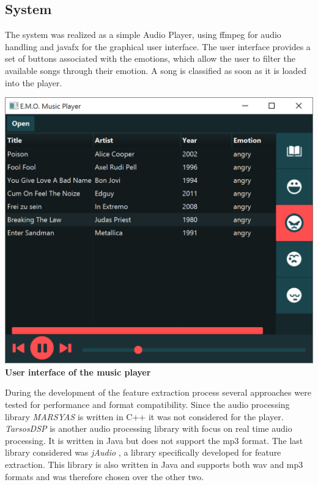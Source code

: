 \begin{multicols}{2}
\section{System}
The system was realized as a simple Audio Player, using ffmpeg for audio handling and javafx for the graphical user interface. The user interface provides a set of buttons associated with the emotions, which allow the user to filter the available songs through their emotion. A song is classified as soon as it is loaded into the player.

\begin{Figure}
	\label{screenshot}
	\includegraphics[width=\linewidth]{images/screenshot.png}
	\centering
	\textbf{User interface of the music player}
\end{Figure}
\vspace*{10pt}

During the development of the feature extraction process several approaches were tested for performance and format compatibility. Since the audio processing library \textit{MARSYAS} \citep{Tzanetakis1999} is written in C++ it was not considered for the player. \textit{TarsosDSP} \citep{Six2014} is another audio processing library with focus on real time audio processing. It is written in Java but does not support the mp3 format. The last library considered was \textit{jAudio} \citep{McEnnis2005}, a library specifically developed for feature extraction. This library is also written in Java and supports both wav and mp3 formats and was therefore chosen over the other two.\\


\end{multicols}
